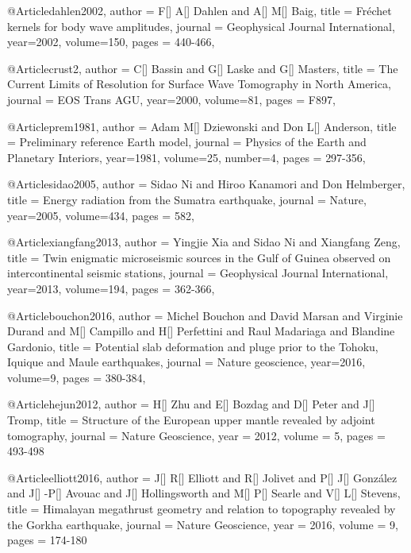 @Article{dahlen2002,
  author =	 {F[] A[] Dahlen and A[] M[] Baig},
  title =	 {Fr\'{e}chet kernels for body wave amplitudes},
  journal =	 {Geophysical Journal International},
  year=2002,
  volume=150,
  pages =	 {440-466},
}


@Article{crust2,
  author =	 {C[] Bassin and G[] Laske and G[] Masters},
  title =	 {The Current Limits of Resolution for Surface Wave Tomography in North America},
  journal =	 {EOS Trans AGU},
  year=2000,
  volume=81,
  pages =	 {F897},
}

@Article{prem1981,
  author =	 {Adam M[] Dziewonski and Don L[] Anderson},
  title =	 {Preliminary reference Earth model},
  journal =	 {Physics of the Earth and Planetary Interiors},
  year=1981,
  volume=25,
  number=4,
  pages =	 {297-356},
}



@Article{sidao2005,
  author =	 {Sidao Ni and Hiroo Kanamori and Don Helmberger},
  title =	 {Energy radiation from the Sumatra earthquake},
  journal =	 {Nature},
  year=2005,
  volume=434,
  pages =	 {582},
}

@Article{xiangfang2013,
  author =	 {Yingjie Xia and Sidao Ni and Xiangfang Zeng},
  title =	 {Twin enigmatic microseismic sources in the Gulf of Guinea observed on intercontinental seismic stations},
  journal =	 {Geophysical Journal International},
  year=2013,
  volume=194,
  pages =	 {362-366},
}

@Article{bouchon2016,
  author =	 {Michel Bouchon and David Marsan and Virginie Durand and M[] Campillo and H[] Perfettini and Raul Madariaga and Blandine Gardonio},
  title =	 {Potential slab deformation and pluge prior to the {T}ohoku, {I}quique and {M}aule earthquakes},
  journal =	 {Nature geoscience},
  year=2016,
  volume=9,
  pages =	 {380-384},
}

@Article{hejun2012,
  author = 	 {H[] Zhu and E[] Bozdag and D[] Peter and J[] Tromp},
  title = 	 {Structure of the European upper mantle revealed by adjoint tomography},
  journal = 	 {Nature Geoscience},
  year = 	 2012,
  volume = 5,
  pages =	 {493-498}
}

@Article{elliott2016,
  author = 	 {J[] R[] Elliott and R[] Jolivet and P[] J[] Gonz\'{a}lez and J[] -P[] Avouac and J[] Hollingsworth and M[] P[] Searle and V[] L[] Stevens},
  title = 	 {Himalayan megathrust geometry and relation to topography revealed by the {G}orkha earthquake},
  journal = 	 {Nature Geoscience},
  year = 	 2016,
  volume = 9,
  pages =	 {174-180}
}

